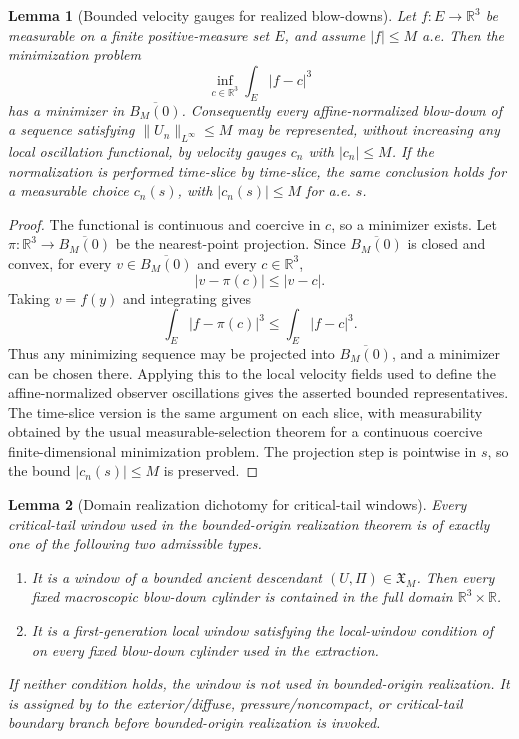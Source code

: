 \documentclass[11pt]{amsart}
\numberwithin{equation}{section}
\theoremstyle{plain}
\newtheorem{lemma}[lemma]{Lemma}
\theoremstyle{definition}
\theoremstyle{remark}
\begin{document}
\begin{lemma}[Bounded velocity gauges for realized blow-downs]
\label{lem:bounded-velocity-gauges-blowdown}
Let \(f:E\to\mathbb R^3\) be measurable on a finite positive-measure set
\(E\), and assume \(|f|\le M\) a.e.  Then the minimization problem
\[
   \inf_{c\in\mathbb R^3}\int_E |f-c|^3
\]
has a minimizer in \(\overline{B_M(0)}\).  Consequently every
affine-normalized blow-down of a sequence satisfying
\(\|U_n\|_{L^\infty}\le M\) may be represented, without increasing any local
oscillation functional, by velocity gauges \(c_n\) with \(|c_n|\le M\).  If the
normalization is performed time-slice by time-slice, the same conclusion holds
for a measurable choice \(c_n(s)\), with \(|c_n(s)|\le M\) for a.e. \(s\).
\end{lemma}

\begin{proof}
The functional is continuous and coercive in \(c\), so a minimizer exists.  Let
\(\pi:\mathbb R^3\to\overline{B_M(0)}\) be the nearest-point projection.  Since
\(\overline{B_M(0)}\) is closed and convex, for every \(v\in\overline{B_M(0)}\)
and every \(c\in\mathbb R^3\),
\[
   |v-\pi(c)|\le |v-c|.
\]
Taking \(v=f(y)\) and integrating gives
\[
   \int_E |f-\pi(c)|^3\le \int_E |f-c|^3 .
\]
Thus any minimizing sequence may be projected into \(\overline{B_M(0)}\), and a
minimizer can be chosen there.  Applying this to the local velocity fields used
to define the affine-normalized observer oscillations gives the asserted
bounded representatives.  The time-slice version is the same argument on each
slice, with measurability obtained by the usual measurable-selection theorem
for a continuous coercive finite-dimensional minimization problem.  The
projection step is pointwise in \(s\), so the bound \(|c_n(s)|\le M\) is
preserved.
\end{proof}

\begin{lemma}[Domain realization dichotomy for critical-tail windows]
\label{lem:critical-tail-domain-realization-dichotomy}
Every critical-tail window used in the bounded-origin realization theorem is of
exactly one of the following two admissible types.
\begin{enumerate}[label=\textup{(\roman*)}]
   \item It is a window of a bounded ancient descendant
   \((U,\Pi)\in\mathfrak X_M\).  Then every fixed macroscopic blow-down cylinder
   is contained in the full domain \(\mathbb R^3\times\mathbb R\).
   \item It is a first-generation local window satisfying the local-window
   condition of  on every fixed
   blow-down cylinder used in the extraction.
\end{enumerate}
If neither condition holds, the window is not used in bounded-origin
realization.  It is assigned by
 to the exterior/diffuse,
pressure/noncompact, or critical-tail boundary branch before bounded-origin
realization is invoked.
\end{lemma}
\end{document}

